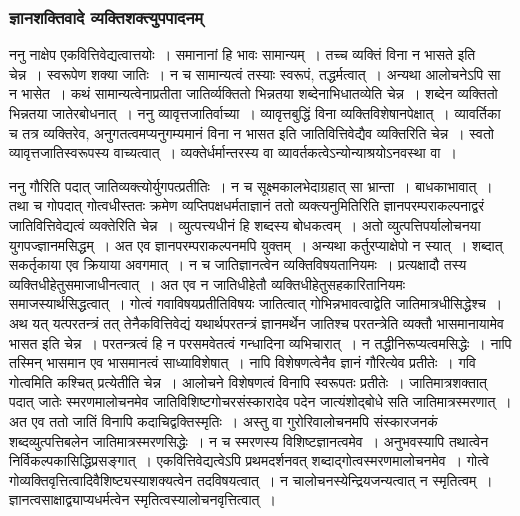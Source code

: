 			\subsubsection{ज्ञानशक्तिवादे व्यक्तिशक्त्युपपादनम्}

				\begin{small}

					ननु नाक्षेप एकवित्तिवेद्यत्वात्तयोः~। समानानां हि भावः सामान्यम्~। तच्च व्यक्तिं विना न भासते इति चेन्न~। स्वरूपेण शक्या जातिः~। न च सामान्यत्वं तस्याः स्वरूपं, तद्धर्मत्वात्~। अन्यथा आलोचनेऽपि सा न भासेत~। कथं सामान्यत्वेनाप्रतीता जातिर्व्यक्तितो भिन्नतया शब्देनाभिधातव्येति चेन्न~। शब्देन व्यक्तितो भिन्नतया जातेरबोधनात्~। ननु व्यावृत्तजातिर्वाच्या~। व्यावृत्तबुद्धिं विना व्यक्तिविशेषानपेक्षात्~। व्यावर्तिका च तत्र व्यक्तिरेव, अनुगतत्वमप्यनुगम्यमानं विना न भासत इति जातिवित्तिवेद्यैव व्यक्तिरिति चेन्न~। स्वतो व्यावृत्तजातिस्वरूपस्य वाच्यत्वात्~। व्यक्तेर्धर्मान्तरस्य वा व्यावर्तकत्वेऽन्योन्याश्रयोऽनवस्था वा~।

					ननु गौरिति पदात् जातिव्यक्त्योर्युगपत्प्रतीतिः~। न च सूक्ष्मकालभेदाग्रहात् सा भ्रान्ता~। बाधकाभावात्~। तथा च गोपदात् गोत्वधीस्ततः क्रमेण व्यप्तिपक्षधर्मताज्ञानं ततो व्यक्त्यनुमितिरिति ज्ञानपरम्पराकल्पनाद्वरं जातिवित्तिवेद्यत्वं व्यक्तेरिति चेन्न~। व्युत्पत्त्यधीनं हि शब्दस्य बोधकत्वम्~। अतो व्युत्पत्तिपर्यालोचनया युगपज्ज्ञानमसिद्धम्~। अत एव ज्ञानपरम्पराकल्पनमपि युक्तम्~। अन्यथा कर्तुरप्याक्षेपो न स्यात्~। शब्दात् सकर्तृकाया एव क्रियाया अवगमात्~। न च जातिज्ञानत्वेन व्यक्तिविषयतानियमः~। प्रत्यक्षादौ तस्य व्यक्तिधीहेतुसमाजाधीनत्वात्~। अत एव न जातिधीहेतौ व्यक्तिधीहेतुसहकारितानियमः समाजस्यार्थसिद्धत्वात्~। गोत्वं गवाविषयप्रतीतिविषयः जातित्वात् गोभिन्नभावत्वाद्वेति जातिमात्रधीसिद्धेश्च~। अथ यत् यत्परतन्त्रं तत् तेनैकवित्तिवेद्यं यथार्थपरतन्त्रं ज्ञानमर्थेन जातिश्च परतन्त्रेति व्यक्तौ  भासमानायामेव भासत इति चेन्न~। परतन्त्रत्वं हि न परसमवेतत्वं गन्धादिना व्यभिचारात्~। न तद्धीनिरूप्यत्वमसिद्धेः~। नापि तस्मिन् भासमान एव भासमानत्वं साध्याविशेषात्~। नापि विशेषणत्वेनैव ज्ञानं गौरित्येव प्रतीतेः~। गवि गोत्वमिति कश्चित् प्रत्येतीति चेन्न~। आलोचने विशेषणत्वं विनापि स्वरूपतः प्रतीतेः~। जातिमात्रशक्तात् पदात् जातेः स्मरणमालोचनमेव जातिविशिष्टगोचरसंस्कारादेव पदेन जात्यंशोद्बोधे सति जातिमात्रस्मरणात्~। अत एव ततो जातिं विनापि कदाचिद्वक्तिस्मृतिः~। अस्तु वा गुरोरिवालोचनमपि संस्कारजनकं शब्दव्युत्पत्तिबलेन जातिमात्रस्मरणसिद्धेः~। न च स्मरणस्य विशिष्टज्ञानत्वमेव~। अनुभवस्यापि तथात्वेन निर्विकल्पकासिद्धिप्रसङ्गात्~। एकवित्तिवेद्यत्वेऽपि प्रथमदर्शनवत् शब्दाद्गोत्वस्मरणमालोचनमेव~। गोत्वे गोव्यक्तिवृत्तित्वादिवैशिष्ट्यस्याशक्यत्वेन तदविषयत्वात्~। न चालोचनस्येन्द्रियजन्यत्वात् न स्मृतित्वम्~। ज्ञानत्वसाक्षाद्व्याप्यधर्मत्वेन स्मृतित्वस्यालोचनवृत्तित्वात्~। 


\end{small}
